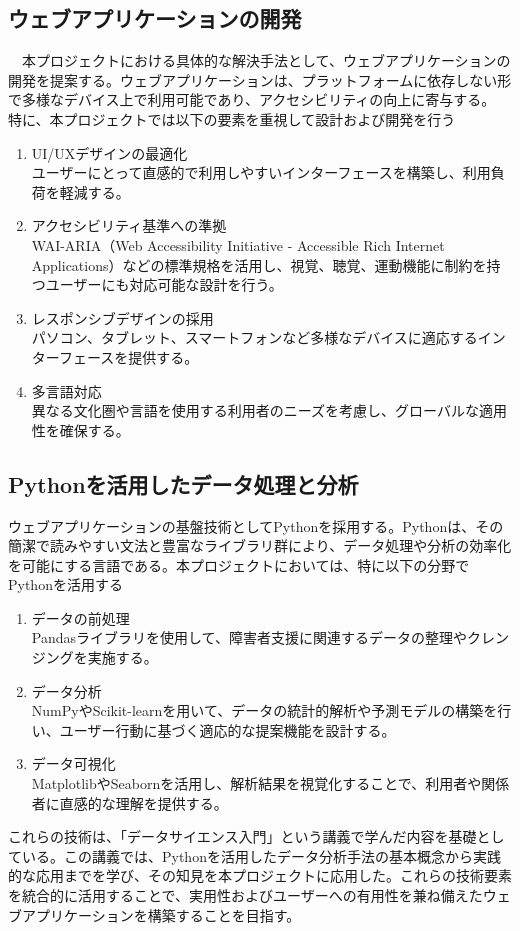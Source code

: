 \subsection{ウェブアプリケーションの開発}
　本プロジェクトにおける具体的な解決手法として、ウェブアプリケーションの開発を提案する。ウェブアプリケーションは、プラットフォームに依存しない形で多様なデバイス上で利用可能であり、アクセシビリティの向上に寄与する。
特に、本プロジェクトでは以下の要素を重視して設計および開発を行う\\
\begin{enumerate}
  \item UI/UXデザインの最適化\\
  ユーザーにとって直感的で利用しやすいインターフェースを構築し、利用負荷を軽減する。\\
  \item アクセシビリティ基準への準拠\\
  WAI-ARIA（Web Accessibility Initiative - Accessible Rich Internet Applications）などの標準規格を活用し、視覚、聴覚、運動機能に制約を持つユーザーにも対応可能な設計を行う。\\
  \item レスポンシブデザインの採用\\
  パソコン、タブレット、スマートフォンなど多様なデバイスに適応するインターフェースを提供する。\\
  \item 多言語対応\\
  異なる文化圏や言語を使用する利用者のニーズを考慮し、グローバルな適用性を確保する。
\end{enumerate}
\subsection{Pythonを活用したデータ処理と分析}
ウェブアプリケーションの基盤技術としてPythonを採用する。Pythonは、その簡潔で読みやすい文法と豊富なライブラリ群により、データ処理や分析の効率化を可能にする言語である。本プロジェクトにおいては、特に以下の分野でPythonを活用する\\
\begin{enumerate}
  \item データの前処理\\
  Pandasライブラリを使用して、障害者支援に関連するデータの整理やクレンジングを実施する。\\
  \item データ分析\\
  NumPyやScikit-learnを用いて、データの統計的解析や予測モデルの構築を行い、ユーザー行動に基づく適応的な提案機能を設計する。\\
  \item データ可視化\\
  MatplotlibやSeabornを活用し、解析結果を視覚化することで、利用者や関係者に直感的な理解を提供する。
\end{enumerate}
これらの技術は、「データサイエンス入門」という講義で学んだ内容を基礎としている。この講義では、Pythonを活用したデータ分析手法の基本概念から実践的な応用までを学び、その知見を本プロジェクトに応用した。これらの技術要素を統合的に活用することで、実用性およびユーザーへの有用性を兼ね備えたウェブアプリケーションを構築することを目指す。

